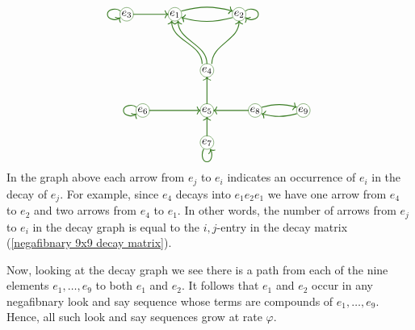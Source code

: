 \documentclass[reqno]{amsart}
\theoremstyle{definition}
\begin{document}
\begin{equation}\label{negafibnary decay graph}
    \begin{tikzpicture}[scale = 0.5, color=OliveGreen]
        \coordinate (1) at (-2,9-1); 
        \coordinate (2) at (2,9-1);
        \coordinate (3) at (-5,9-1);
        \coordinate (4) at (0,4.5);
        \coordinate (5) at (0,0+2);
        \coordinate (6) at (-4,0+2);
        \coordinate (7) at (0,-4+4);
        \coordinate (8) at (3,0+2);
        \coordinate (9) at (6,0+2);
        \draw[fill=white] \foreach \m in {1,...,9} {
            (\m) circle (12pt) 
            };
        \draw \foreach \m in {1,...,9} {
            node[text=black] at (\m) {$e_\m$}
        };
        \draw[->,thick] (-1.6,9.2-1) to[out=15, in=165] (1.6,9.2-1);
        \draw[<-,thick] (-1.6,8.8-1) to[out=-15, in=-165] (1.6,8.8-1);
        \draw[<-,thick] (2.4,8.8-1) to[out=-45, in=down] (3.2,9-1) to[out=up, in=45] (2.4,9.2-1);
        \draw[->,thick] (-4.6,9-1) to[out=right, in=left] (-2.4,9-1);
        \draw[<-,thick] (-5.4,8.8-1) to[out=-135, in=down] (-6.2,9-1) to[out=up, in=135] (-5.4,9.2-1);
        \draw[->,thick] (-0.3,4.9) to[out=up, in=down] (-2.2,8.6-1);
        \draw[->,thick] (0,4.9) to[out=up, in=down] (-1.8,8.6-1);
        \draw[->,thick] (0.3,4.9) to[out=up, in=down] (2,8.6-1);
        \draw[->,thick] (0,0.4+2) to[out=up, in=down] (0, 4.1);
        \draw[->,thick] (0,-3.6+4) to[out=up, in=down] (0, -0.4+2);
        \draw[<-,thick] (0.2,-4.4+4) to[out=-60, in=right] (0,-5.2+4) to[out=left, in=-120] (-0.2,-4.4+4);
        \draw[->,thick] (-3.6,0+2) to[out=right, in=left] (-0.4,0+2);
        \draw[<-,thick] (-4.4,-0.2+2) to[out=-135, in=down] (-5.2,0+2) to[out=up, in=135] (-4.4,0.2+2);
        \draw[<-,thick] (0.4,0+2) to[out=right, in=left] (2.6,0+2);
        \draw[->,thick] (3.4,0.2+2) to[out=15, in=165] (5.6,0.2+2);
        \draw[<-,thick] (3.4,-0.2+2) to[out=-15, in=-165] (5.6,-0.2+2);
    \end{tikzpicture}
\end{equation}
In the graph above each arrow from $e_j$ to $e_i$ indicates an occurrence of $e_i$ in the decay of $e_j$. For example, since $e_4$ decays into $e_1e_2e_1$ we have one arrow from $e_4$ to $e_2$ and two arrows from $e_4$ to $e_1$. In other words, the number of arrows from $e_j$ to $e_i$ in the decay graph is equal to the $i,j$-entry in the decay matrix (\ref{negafibnary 9x9 decay matrix}). 

Now, looking at the decay graph we see there is a path from each of the nine elements $e_1,\ldots,e_9$ to both $e_1$ and $e_2$. It follows that $e_1$ and $e_2$ occur in any negafibnary look and say sequence whose terms are compounds of $e_1,\ldots,e_9$. Hence, all such look and say sequences grow at rate $\varphi$. 
\end{document}
